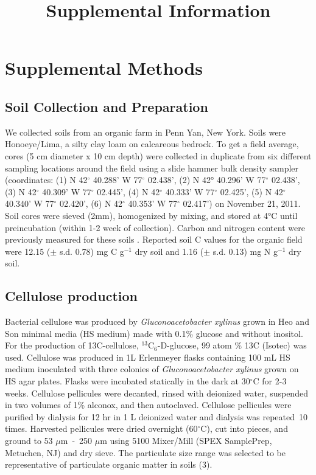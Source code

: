 \documentclass{article}
\title{Supplemental Information}
\date{\vspace{-5ex}}
\begin{document}
\maketitle

\tableofcontents



\section{Supplemental Methods}\label{SI} 

\subsection{Soil Collection and Preparation} 
We collected soils from an organic farm in Penn Yan, New York. Soils were
Honoeye/Lima, a silty clay loam on calcareous bedrock. To get a field average,
cores (5 cm diameter x 10 cm depth) were collected in duplicate from six
different sampling locations around the field using a slide hammer bulk density
sampler (coordinates: (1) N 42$^{\circ}$ 40.288’ W 77$^{\circ}$ 02.438’, (2)
N 42° 40.296’ W 77$^{\circ}$ 02.438’, (3) N 42$^{\circ}$ 40.309’ W 77$^{\circ}$
02.445’, (4) N 42$^{\circ}$ 40.333’ W 77$^{\circ}$ 02.425’, (5) N 42$^{\circ}$
   40.340’ W 77$^{\circ}$ 02.420’, (6) N 42$^{\circ}$ 40.353’ W 77$^{\circ}$
      02.417’) on November 21,
2011. Soil cores were sieved (2mm), homogenized by mixing, and
stored at 4°C until preincubation (within 1-2 week of collection).
Carbon and nitrogen content were previously measured for these soils
\citep{Berthrong_2013}. Reported soil C values for the organic field were
12.15 ($\pm$ s.d. 0.78) mg C g$^{-1}$ dry soil and 1.16 ($\pm$ s.d. 0.13)
mg N g$^{-1}$ dry soil. 

\subsection{Cellulose production}
Bacterial cellulose was produced by \textit{Gluconoacetobacter xylinus} grown
in Heo and Son \citep{Heo_2002} minimal media (HS medium) made with 0.1\%
glucose and without inositol.  For the production of 13C-cellulose,
$^{13}$C$_{6}$-D-glucose, 99 atom \% 13C (Isotec) was used. Cellulose was
produced in 1L Erlenmeyer flasks containing 100 mL HS medium inoculated with
three colonies of \textit{Gluconoacetobacter xylinus} grown on HS agar plates.
Flasks were incubated statically in the dark at 30$^{\circ}$C for 2-3 weeks.
Cellulose pellicules were decanted, rinsed with deionized water, suspended in
two volumes of 1\% alconox, and then autoclaved. Cellulose pellicules were
purified by dialysis for 12 hr in 1 L deionized water and dialysis was
repeated~10 times. Harvested pellicules were dried overnight (60$^{\circ}$C),
cut into pieces, and ground to 53 $\mu$m~-~250 $\mu$m using 5100 Mixer/Mill (SPEX
SamplePrep, Metuchen, NJ) and dry sieve. The particulate size range was
selected to be representative of particulate organic matter in soils (3).
\end{document}
